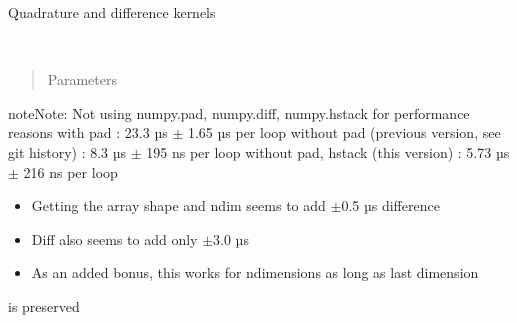 \documentclass[letterpaper,10pt,english]{sphinxmanual}
\begin{document}
\label{\detokenize{documentation:module-elastica._calculus}}
Quadrature and difference kernels

\begin{fulllineitems}
\label{\detokenize{documentation:elastica._calculus.difference_kernel}}~\begin{quote}\begin{description}
\item[{Parameters}] \leavevmode
{} \textendash{} 

\end{description}\end{quote}

\begin{sphinxadmonition}{note}{Note:}
Not using numpy.pad, numpy.diff, numpy.hstack for performance reasons
with pad : 23.3 µs \(\pm\) 1.65 µs per loop
without pad (previous version, see git history) : 8.3 µs \(\pm\) 195 ns per loop
without pad, hstack (this version) : 5.73 µs \(\pm\) 216 ns per loop
\begin{itemize}
\item {} 
Getting the array shape and ndim seems to add \(\pm\)0.5 µs difference

\item {} 
Diff also seems to add only \(\pm\)3.0 µs

\item {} 
As an added bonus, this works for n\sphinxhyphen{}dimensions as long as last dimension

\end{itemize}

is preserved
\end{sphinxadmonition}

\end{fulllineitems}

\end{document}
